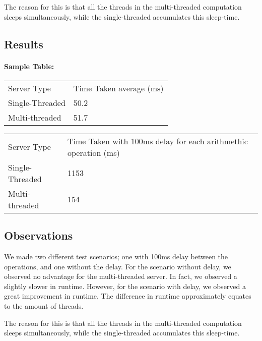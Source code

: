 \documentclass{article}
\begin{document}
The reason for this is that all the threads in the multi-threaded computation sleeps simultaneously, while the single-threaded accumulates this sleep-time.

\subsection{\textbf{Results}}

\paragraph{\textbf{Sample Table:}}

\begin{table}
\centering

\begin{tabular}{l l}
Server Type & Time Taken average (ms)\\

Single-Threaded & 50.2\\
Multi-threaded& 51.7\\

\end{tabular}

\end{table}
\begin{table}
\centering

\begin{tabular}{l l}
Server Type & Time Taken  with 100ms delay for each arithmethic operation (ms)\\

Single-Threaded & 1153\\
Multi-threaded& 154\\

\end{tabular}

\end{table}
\subsection{\textbf{Observations}}

We made two different test scenarios; one with 100ms delay between the operations, and one without the delay. For the scenario without delay, we observed no advantage for the multi-threaded server. In fact, we observed a slightly slower in runtime. However, for the scenario with delay, we observed a great improvement in runtime. The difference in runtime approximately equates to the amount of threads.

The reason for this is that all the threads in the multi-threaded computation sleeps simultaneously, while the single-threaded accumulates this sleep-time.
\end{document}
